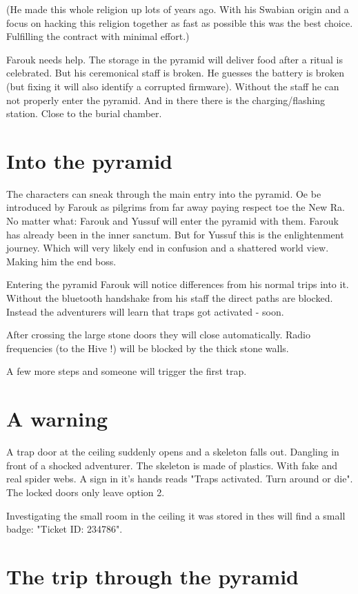 (He made this whole religion up lots of years ago. With his Swabian origin and a focus on hacking this religion together as fast as possible this was the best choice. Fulfilling the contract with minimal effort.)

Farouk needs help. The storage in the pyramid will deliver food after a ritual is celebrated. But his ceremonical staff is broken. He guesses the battery is broken (but fixing it will also identify a corrupted firmware). Without the staff he can not properly enter the pyramid. And in there there is the charging/flashing station. Close to the burial chamber.

\section{Into the pyramid}

The characters can sneak through the main entry into the pyramid. Oe be introduced by Farouk as pilgrims from far away paying respect toe the New Ra. No matter what: Farouk and Yussuf will enter the pyramid with them. Farouk has already been in the inner sanctum. But for Yussuf this is the enlightenment journey. Which will very likely end in confusion and a shattered world view. Making him the end boss.

Entering the pyramid Farouk will notice differences from his normal trips into it. Without the bluetooth handshake from his staff the direct paths are blocked. Instead the adventurers will learn that traps got activated - soon.

After crossing the large stone doors they will close automatically. Radio frequencies (to the Hive !) will be blocked by the thick stone walls.

A few more steps and someone will trigger the first trap.

\section{A warning}

A trap door at the ceiling suddenly opens and a skeleton falls out. Dangling in front of a shocked adventurer. The skeleton is made of plastics. With fake and real spider webs. A sign in it's hands reads "Traps activated. Turn around or die". The locked doors only leave option 2.

Investigating the small room in the ceiling it was stored in thes will find a small badge: "Ticket ID: 234786".

\section{The trip through the pyramid}

